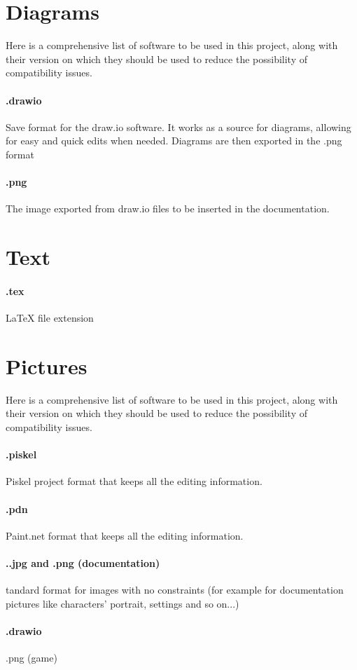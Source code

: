 \section{Diagrams}
Here is a comprehensive list of software to be used in this project, along with their version on which they should be used to reduce the possibility of compatibility issues.
\paragraph{.drawio}
Save format for the draw.io software. It works as a source for diagrams, allowing for easy and quick edits when needed. Diagrams are then exported in the .png format
\paragraph{.png}
The image exported from draw.io files to be inserted in the documentation.

\section{Text}
\paragraph{.tex}
LaTeX file extension

\section{Pictures}
Here is a comprehensive list of software to be used in this project, along with their version on which they should be used to reduce the possibility of compatibility issues.
\paragraph{.piskel} Piskel project format that keeps all the editing information.
\paragraph{.pdn} Paint.net format that keeps all the editing information.
\paragraph{..jpg and .png (documentation)} tandard format for images with no constraints (for example for documentation pictures like characters' portrait, settings and so on...)
\paragraph{.drawio} .png (game) \\

